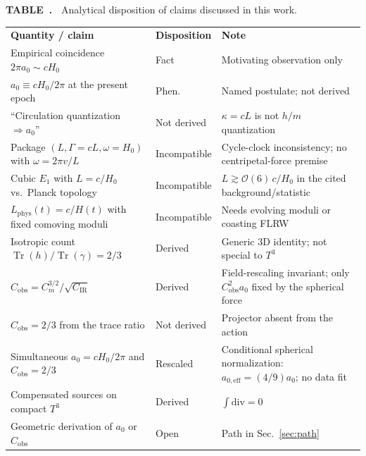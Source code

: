 \documentclass[aps,prd,reprint,superscriptaddress,nofootinbib,floatfix,showkeys]{revtex4-2}
\newcommand{\Tthree}{T^{3}}
\newcommand{\Cobs}{C_{\mathrm{obs}}}
\newcommand{\Cm}{C_{m}}
\newcommand{\CIR}{C_{\mathrm{IR}}}
\newcommand{\azero}{a_{0}}
\newcommand{\Hzero}{H_{0}}
\begin{document}
\begin{minipage}{\textwidth}
\small
\noindent\textbf{TABLE~\thetable.\ }
Analytical disposition of claims discussed in this work.\\[0.55em]
\begin{ruledtabular}
\begin{tabular}{@{}p{}@{\hspace{0.8em}}p{}@{\hspace{0.8em}}p{}@{}}
\textbf{Quantity / claim} & \textbf{Disposition} & \textbf{Note} \\
\colrule
Empirical coincidence \(2\pi\azero\sim c\Hzero\)
  & Fact & Motivating observation only \\
\hline
\(\azero\equiv c\Hzero/2\pi\) at the present epoch
  & Phen. & Named postulate; not derived \\
\hline
``Circulation quantization \(\Rightarrow\azero\)''
  & Not derived & \(\kappa=cL\) is not \(h/m\) quantization \\
\hline
Package \((L,\Gamma=cL,\omega=\Hzero)\) with \(\omega=2\pi v/L\)
  & Incompatible & Cycle-clock inconsistency; no centripetal-force premise \\
\hline
Cubic \(E_1\) with \(L=c/\Hzero\) vs.\ Planck topology
  & Incompatible & \(L\gtrsim\mathcal{O}(6)\,c/\Hzero\) in the cited background/statistic \\
\hline
\(L_{\mathrm{phys}}(t)=c/H(t)\) with fixed comoving moduli
  & Incompatible & Needs evolving moduli or coasting FLRW \\
\hline
Isotropic count \(\operatorname{Tr}(h)/\operatorname{Tr}(\gamma)=2/3\)
  & Derived & Generic 3D identity; not special to \(\Tthree\) \\
\hline
\(\Cobs=\Cm^{3/2}/\sqrt{\CIR}\)
  & Derived & Field-rescaling invariant; only \(\Cobs^2\azero\) fixed by the spherical force \\
\hline
\(\Cobs=2/3\) from the trace ratio
  & Not derived & Projector absent from the action \\
\hline
Simultaneous \(\azero=c\Hzero/2\pi\) and \(\Cobs=2/3\)
  & Rescaled & Conditional spherical normalization: \(a_{0,\mathrm{eff}}=(4/9)\azero\); no data fit \\
\hline
Compensated sources on compact \(\Tthree\)
  & Derived & \(\int\mathrm{div}=0\) \\
\hline
Geometric derivation of \(\azero\) or \(\Cobs\)
  & Open & Path in Sec.~\ref{sec:path} \\
\end{tabular}
\end{ruledtabular}
\end{minipage}
\vspace{1.0em}
\twocolumngrid
\end{document}
